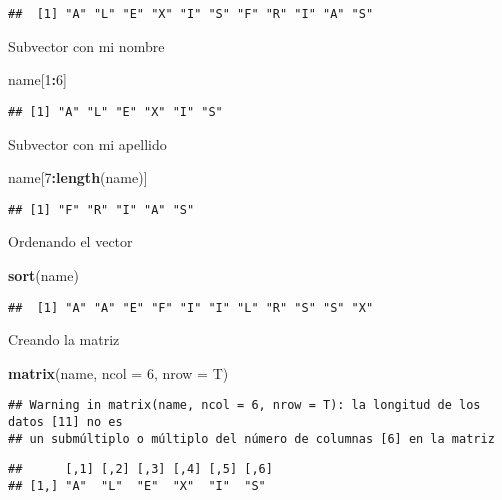 \documentclass[
]{article}
\newenvironment{Shaded}{\begin{snugshade}}{\end{snugshade}}
\newcommand{\DataTypeTok}[1]{\textcolor[rgb]{0.13,0.29,0.53}{#1}}
\newcommand{\DecValTok}[1]{\textcolor[rgb]{0.00,0.00,0.81}{#1}}
\newcommand{\KeywordTok}[1]{\textcolor[rgb]{0.13,0.29,0.53}{\textbf{#1}}}
\newcommand{\NormalTok}[1]{#1}
\newcommand{\OperatorTok}[1]{\textcolor[rgb]{0.81,0.36,0.00}{\textbf{#1}}}
\begin{document}
\begin{verbatim}
##  [1] "A" "L" "E" "X" "I" "S" "F" "R" "I" "A" "S"
\end{verbatim}

Subvector con mi nombre

\begin{Shaded}
\begin{Highlighting}[]
\NormalTok{name[}\DecValTok{1}\OperatorTok{:}\DecValTok{6}\NormalTok{]}
\end{Highlighting}
\end{Shaded}

\begin{verbatim}
## [1] "A" "L" "E" "X" "I" "S"
\end{verbatim}

Subvector con mi apellido

\begin{Shaded}
\begin{Highlighting}[]
\NormalTok{name[}\DecValTok{7}\OperatorTok{:}\KeywordTok{length}\NormalTok{(name)]}
\end{Highlighting}
\end{Shaded}

\begin{verbatim}
## [1] "F" "R" "I" "A" "S"
\end{verbatim}

Ordenando el vector

\begin{Shaded}
\begin{Highlighting}[]
\KeywordTok{sort}\NormalTok{(name)}
\end{Highlighting}
\end{Shaded}

\begin{verbatim}
##  [1] "A" "A" "E" "F" "I" "I" "L" "R" "S" "S" "X"
\end{verbatim}

Creando la matriz

\begin{Shaded}
\begin{Highlighting}[]
\KeywordTok{matrix}\NormalTok{(name, }\DataTypeTok{ncol =} \DecValTok{6}\NormalTok{, }\DataTypeTok{nrow =}\NormalTok{ T)}
\end{Highlighting}
\end{Shaded}

\begin{verbatim}
## Warning in matrix(name, ncol = 6, nrow = T): la longitud de los datos [11] no es
## un submúltiplo o múltiplo del número de columnas [6] en la matriz
\end{verbatim}

\begin{verbatim}
##      [,1] [,2] [,3] [,4] [,5] [,6]
## [1,] "A"  "L"  "E"  "X"  "I"  "S"
\end{verbatim}
\end{document}
